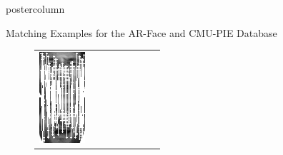 \documentclass[final,hyperref={pdfpagelabels=false}]{beamer}
\begin{document}
\begin{frame}
\begin{columns}
\begin{column}{.49\textwidth}
\begin{beamercolorbox}[center,wd=\textwidth]{postercolumn}
\begin{minipage}[T]{.95\textwidth}
{\begin{block}{Matching Examples for the AR-Face and CMU-PIE Database}
\begin{figure}
\begin{tabular}{p{.09\linewidth} | p{.12\linewidth} | p{.12\linewidth} | p{.12\linewidth} || p{.12\linewidth} | p{.12\linewidth} | p{.12\linewidth} | p{.09\linewidth} }
                  \includegraphics[width=1.0\linewidth]{paper/bmvc09-surf/figures/matchings/arface-sift/grid_m-005-17.pgm--m-005-4}
                  &

\end{tabular}
\end{figure}
\end{block}}
\end{minipage}
\end{beamercolorbox}
\end{column}
\end{columns}
\end{frame}
\end{document}
